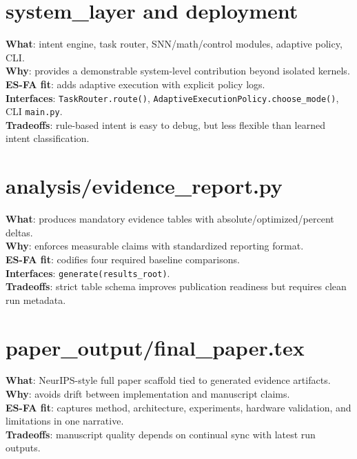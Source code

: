 \documentclass[11pt]{article}
\begin{document}
\section{system\_layer and deployment}
\textbf{What}: intent engine, task router, SNN/math/control modules, adaptive policy, CLI.\\
\textbf{Why}: provides a demonstrable system-level contribution beyond isolated kernels.\\
\textbf{ES-FA fit}: adds adaptive execution with explicit policy logs.\\
\textbf{Interfaces}: \texttt{TaskRouter.route()}, \texttt{AdaptiveExecutionPolicy.choose\_mode()}, CLI \texttt{main.py}.\\
\textbf{Tradeoffs}: rule-based intent is easy to debug, but less flexible than learned intent classification.

\section{analysis/evidence\_report.py}
\textbf{What}: produces mandatory evidence tables with absolute/optimized/percent deltas.\\
\textbf{Why}: enforces measurable claims with standardized reporting format.\\
\textbf{ES-FA fit}: codifies four required baseline comparisons.\\
\textbf{Interfaces}: \texttt{generate(results\_root)}.\\
\textbf{Tradeoffs}: strict table schema improves publication readiness but requires clean run metadata.

\section{paper\_output/final\_paper.tex}
\textbf{What}: NeurIPS-style full paper scaffold tied to generated evidence artifacts.\\
\textbf{Why}: avoids drift between implementation and manuscript claims.\\
\textbf{ES-FA fit}: captures method, architecture, experiments, hardware validation, and limitations in one narrative.\\
\textbf{Tradeoffs}: manuscript quality depends on continual sync with latest run outputs.
\end{document}
